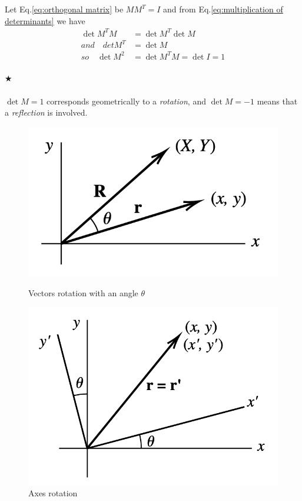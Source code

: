             Let Eq.\eqref{eq:orthogonal matrix} be $MM^T=I$ and from Eq.\eqref{eq:multiplication of determinants} we have
            \begin{align*}
                \det{M^TM} &= \det{M^T} \det{M}\\
                and \quad det{M^T} &= \det{M}\\
                so\quad \det{M}^2 &= \det{M^TM} = \det{I} = 1
            \end{align*}

            \paragraph{$\bigstar$} $\det{M} = 1$ corresponds geometrically to a \textit{rotation}, 
            and $\det{M} = -1$ means that a \textit{reflection} is involved.

            \begin{figure}
                \includegraphics[width=0.9\linewidth]{figures/vectors rotation.png}
                \caption{Vectors rotation with an angle $\theta$}
                \label{fig:vectors rotation}
                \includegraphics[width=0.9\linewidth]{figures/axes rotation.png}
                \caption{Axes rotation}
                \label{fig:axes rotation}
            \end{figure}

